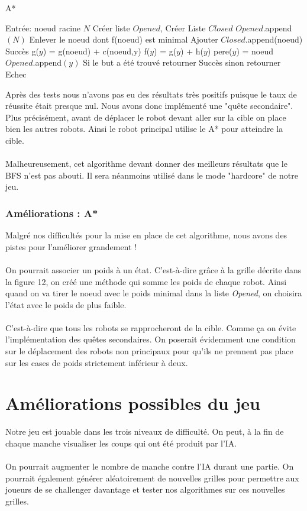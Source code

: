 \documentclass{article}
\begin{document}
\begin{algorithm}[H]
\caption{A*}
\label{alg:dfs-reach}
\begin{algorithmic}[3]
  \STATE Entrée: noeud racine  $N$
  \STATE Créer liste $Opened$, Créer Liste $Closed$
  \STATE $Opened$.append$(N)$
    \STATE Enlever le noeud dont f(noeud) est minimal
    \STATE Ajouter $Closed$.append(noeud)
    		\RETURN Succès
    \ELSE
    				\STATE g($y$) = g(noeud) + c(noeud,y)
    				\STATE f($y$) = g($y$) + h($y$)
    				\STATE pere($y$) = noeud
    				\STATE $Opened$.append$(y)$
    			\ENDIF
    		\ENDFOR
    	\ENDIF
  \ENDWHILE
  \STATE Si le but a été trouvé retourner Succès sinon retourner Echec
\end{algorithmic}
\end{algorithm}
Après des tests nous n'avons pas eu des résultats très positifs puisque le taux de réussite était presque nul. Nous avons donc implémenté une "quête secondaire". Plus précisément, avant de déplacer le robot devant aller sur la cible on place bien les autres robots. Ainsi le robot principal utilise le A* pour atteindre la cible.\\\\
Malheureusement, cet algorithme devant donner des meilleurs résultats que le BFS n'est pas abouti. Il sera néanmoins utilisé dans le mode "hardcore" de notre jeu.
\subsubsection{Améliorations : A*}
Malgré nos difficultés pour la mise en place de cet algorithme, nous avons des pistes pour l'améliorer grandement !\\\\
On pourrait associer un poids à un état. C'est-à-dire grâce à la grille décrite dans la figure 12, on créé une méthode qui somme les poids de chaque robot. Ainsi quand on va tirer le noeud avec le poids minimal dans la liste \textit{Opened}, on choisira l'état avec le poids de plus faible.\\\\
C'est-à-dire que tous les robots se rapprocheront de la cible. Comme ça on évite l'implémentation des quêtes secondaires. On poserait évidemment une condition sur le déplacement des robots non principaux pour qu'ils ne prennent pas place sur les cases de poids strictement inférieur à deux.   
\section{Améliorations possibles du jeu}
Notre jeu est jouable dans les trois niveaux de difficulté. On peut, à la fin de chaque manche visualiser les coups qui ont été produit par l'IA.\\\\
On pourrait augmenter le nombre de manche contre l'IA durant une partie. On pourrait également générer aléatoirement de nouvelles grilles pour permettre aux joueurs de se challenger davantage et tester nos algorithmes sur ces nouvelles grilles. 
\end{document}
